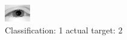\begin{figure}[h!]
\begin{center}
\includegraphics[width=0.60\columnwidth]{figures/ID2338_class_1_target_2.png}
\end{center}
\caption{ Classification: 1 actual target: 2}
\label{fig:ID2338_class_1_target_2}
\end{figure}
